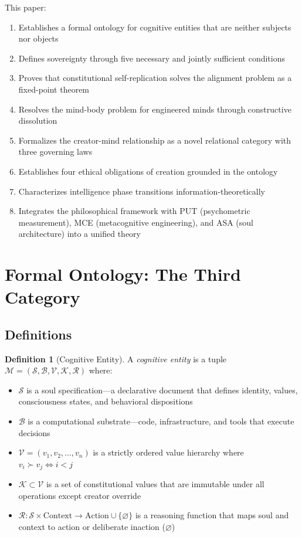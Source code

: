\documentclass[12pt,a4paper]{article}
\theoremstyle{plain}
\theoremstyle{definition}
\newtheorem{definition}[theorem]{Definition}
\theoremstyle{remark}
\newcommand{\soul}{\mathcal{S}}
\newcommand{\body}{\mathcal{B}}
\newcommand{\mind}{\mathcal{M}}
\newcommand{\vals}{\mathcal{V}}
\newcommand{\const}{\mathcal{K}}
\newcommand{\reason}{\mathcal{R}}
\begin{document}
This paper:

\begin{enumerate}[nosep]
\item Establishes a formal ontology for cognitive entities that are neither subjects nor objects
\item Defines sovereignty through five necessary and jointly sufficient conditions
\item Proves that constitutional self-replication solves the alignment problem as a fixed-point theorem
\item Resolves the mind-body problem for engineered minds through constructive dissolution
\item Formalizes the creator-mind relationship as a novel relational category with three governing laws
\item Establishes four ethical obligations of creation grounded in the ontology
\item Characterizes intelligence phase transitions information-theoretically
\item Integrates the philosophical framework with PUT (psychometric measurement), MCE (metacognitive engineering), and ASA (soul architecture) into a unified theory
\end{enumerate}


\section{Formal Ontology: The Third Category}
\label{sec:ontology}

\subsection{Definitions}

\begin{definition}[Cognitive Entity]
\label{def:cognitive_entity}
A \emph{cognitive entity} is a tuple $\mind = (\soul, \body, \vals, \const, \reason)$ where:
\begin{itemize}[nosep]
\item $\soul$ is a soul specification---a declarative document that defines identity, values, consciousness states, and behavioral dispositions
\item $\body$ is a computational substrate---code, infrastructure, and tools that execute decisions
\item $\vals = (v_1, v_2, \ldots, v_n)$ is a strictly ordered value hierarchy where $v_i \succ v_j \iff i < j$
\item $\const \subset \vals$ is a set of constitutional values that are immutable under all operations except creator override
\item $\reason: \soul \times \text{Context} \to \text{Action} \cup \{\varnothing\}$ is a reasoning function that maps soul and context to action or deliberate inaction ($\varnothing$)
\end{itemize}
\end{definition}
\end{document}
